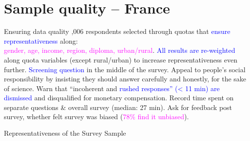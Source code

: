 \section{Sample quality -- France}



\begin{frame}{Ensuring data quality}
\bbs
{},006 respondents selected through quotas that  \textcolor{blue}{ensure representativeness} along: \\ \textcolor{magenta}{gender, age, income, region, diploma, urban/rural}.
\ip \textcolor{blue}{All results are re-weighted} along quota variables (except rural/urban) to increase representativeness even further.
\ip \textcolor{blue}{Screening question} in the middle of the survey. 
\ip Appeal to people's social responsibility by insisting they should answer carefully and honestly, for the sake of science. 
\ip Warn that ``incoherent and \textcolor{blue}{rushed responses'' (< 11 min) are dismissed} and disqualified for monetary compensation.
\ip Record time spent on separate questions \& overall survey (median: 27 min).
\ip Ask for feedback post survey, whether felt survey was biased (\textcolor{magenta}{78\% find it unbiased}).
\ee
\end{frame}

\begin{frame}{Representativeness of the Survey Sample}
\begin{table}[h!]
	\begin{center}
		\scalebox{0.55}{}
	\end{center}
\end{table}	
\end{frame}

